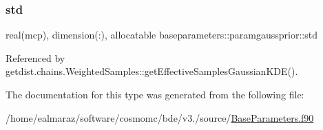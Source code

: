 \subsubsection{\texorpdfstring{std}{std}}
{\footnotesize\ttfamily real(mcp), dimension(\+:), allocatable baseparameters\+::paramgaussprior\+::std\hspace{0.3cm}{\ttfamily [private]}}



Referenced by getdist.\+chains.\+Weighted\+Samples\+::get\+Effective\+Samples\+Gaussian\+K\+D\+E().



The documentation for this type was generated from the following file\+:\begin{DoxyCompactItemize}
\item 
/home/ealmaraz/software/cosmomc/bde/v3./source/\mbox{\hyperlink{BaseParameters_8f90}{Base\+Parameters.\+f90}}\end{DoxyCompactItemize}
